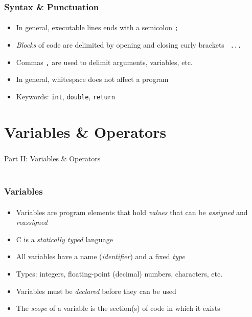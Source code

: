 \documentclass[]{beamer}
\begin{document}
\begin{frame}[fragile]
    \frametitle{Syntax \& Punctuation}
    \framesubtitle{}

\begin{itemize}[<+->]
  \item In general, executable lines ends with a semicolon \texttt{;}
  \item \emph{Blocks} of code are delimited by opening and closing curly brackets \texttt{{ ... }}
  \item Commas \texttt{,} are used to delimit arguments, variables, etc.
  \item In general, whitespace does not affect a program
  \item Keywords: \texttt{int}, \texttt{double}, \texttt{return}
\end{itemize}
  
\end{frame}


\section{Variables \& Operators}

\begin{frame}
    \frametitle{}
    \framesubtitle{}
    
    \begin{center}
    {\Huge Part II: Variables \& Operators}\\
    {\Large ~}
    \end{center}

\end{frame}

\begin{frame}[fragile]
    \frametitle{Variables}
    \framesubtitle{}

\begin{itemize}[<+->]
  \item Variables are program elements that hold \emph{values} that can be \emph{assigned} and \emph{reassigned}
  \item C is a \emph{statically typed} language
  \item All variables have a name (\emph{identifier}) and a fixed \emph{type}
  \item Types: integers, floating-point (decimal) numbers, characters, etc.
  \item Variables must be \emph{declared} before they can be used
  \item The \emph{scope} of a variable is the section(s) of code in which it exists
\end{itemize}

\end{frame}
\end{document}
